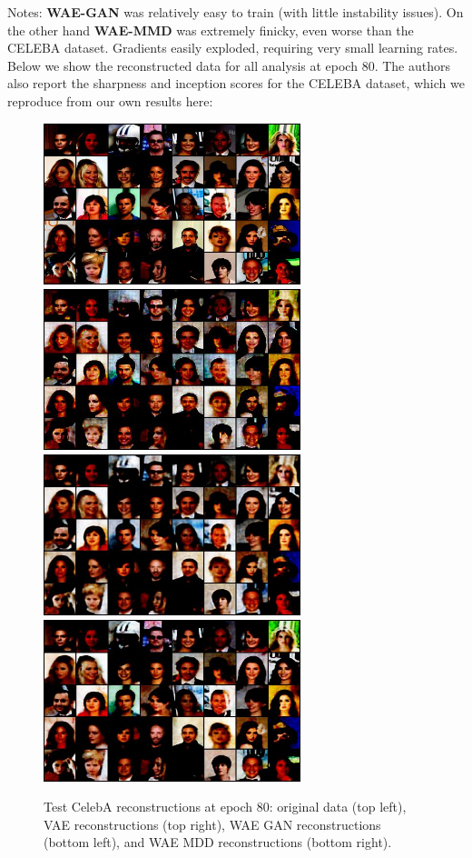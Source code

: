 \documentclass[12pt,english]{amsart}
\begin{document}
Notes: \textbf{WAE-GAN}  was relatively easy to train (with little instability
issues). On the other hand \textbf{WAE-MMD} was extremely finicky, even worse
than the CELEBA dataset. Gradients easily exploded, requiring very small
learning rates. \\

Below we show the reconstructed data for all analysis at epoch 80. The authors
also report the sharpness and inception scores for the CELEBA dataset, which we
reproduce from our own results here: \\

\begin{figure}[htp]
\centering
\includegraphics[width=75mm]{./figures/celeb_vae_ep_79_data}
\includegraphics[width=75mm]{./figures/celeb_vae_ep_79_recon}
\includegraphics[width=75mm]{./figures/celeb_wae-mmd_ep_79_recon}
\includegraphics[width=75mm]{./figures/celeb_wae-gan_ep_79_recon}
\caption{Test CelebA reconstructions at epoch 80: original data (top left), VAE
         reconstructions (top right), WAE GAN reconstructions (bottom left), and
         WAE MDD reconstructions (bottom right).}
\label{Figure 2}
\end{figure}
\end{document}
